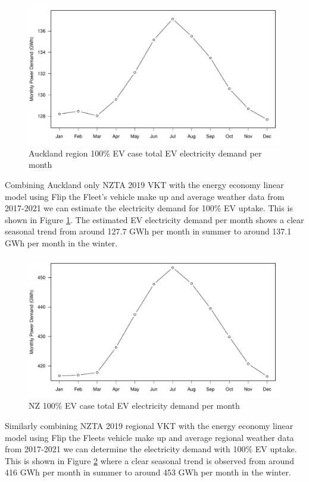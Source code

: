 \documentclass[
]{article}
\begin{document}
\begin{figure}
\centering
\includegraphics{final_report_files/figure-latex/Auckland_power-1.pdf}
\caption{Auckland region 100\% EV case total EV electricity demand per
month\label{fig:Auckland_power}}
\end{figure}

Combining Auckland only NZTA 2019 VKT with the energy economy linear
model using Flip the Fleet's vehicle make up and average weather data
from 2017-2021 we can estimate the electricity demand for 100\% EV
uptake. This is shown in Figure \ref{fig:Auckland_power}. The estimated
EV electricity demand per month shows a clear seasonal trend from around
127.7 GWh per month in summer to around 137.1 GWh per month in the
winter.

\begin{figure}
\centering
\includegraphics{final_report_files/figure-latex/NZ_power-1.pdf}
\caption{NZ 100\% EV case total EV electricity demand per
month\label{fig:NZ_power}}
\end{figure}

Similarly combining NZTA 2019 regional VKT with the energy economy
linear model using Flip the Fleets vehicle make up and average regional
weather data from 2017-2021 we can determine the electricity demand with
100\% EV uptake. This is shown in Figure \ref{fig:NZ_power} where a
clear seasonal trend is observed from around 416 GWh per month in summer
to around 453 GWh per month in the winter.
\end{document}
